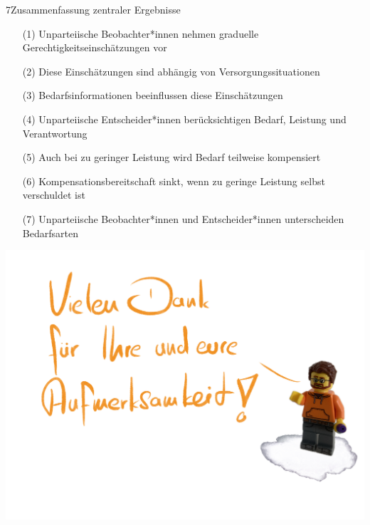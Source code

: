 \documentclass[xcolor=table,9pt,aspectratio=169]{beamer}
\begin{document}
\begin{frame}{\vspace*{10mm}7\hspace*{1em}Zusammenfassung zentraler Ergebnisse}
\vspace*{-10mm}
\begin{itemize}
   \item[(1)] Unparteiische Beobachter*innen nehmen graduelle Gerechtigkeitseinschätzungen vor
   \item[(2)] Diese Einschätzungen sind abhängig von Versorgungssituationen
   \item[(3)] Bedarfsinformationen beeinflussen diese Einschätzungen
\end{itemize}

\vspace{1em}
\begin{itemize}
   \item[(4)] Unparteiische Entscheider*innen berücksichtigen Bedarf, Leistung und Verantwortung
   \item[(5)] Auch bei zu geringer Leistung wird Bedarf teilweise kompensiert
   \item[(6)] Kompensationsbereitschaft sinkt, wenn zu geringe Leistung selbst verschuldet ist
\end{itemize}

\vspace{1em}
\begin{itemize}
   \item[(7)] Unparteiische Beobachter*innen und Entscheider*innen unterscheiden Bedarfsarten
\end{itemize}
\end{frame}


\begin{frame}{}
\includegraphics[width=0.8\linewidth]{figures/slides_thanks.pdf}
\end{frame}
\end{document}
